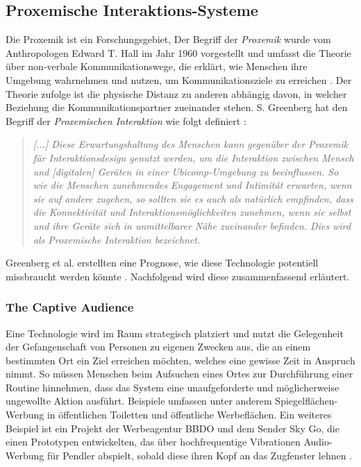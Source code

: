 \documentclass[a4paper]{article}
\newcommand{\todo}[1]{{\color{purple}{#1}}}
\begin{document}
\subsection{Proxemische Interaktions-Systeme}
\label{sub:proxemische_interaktions-systeme}{}
Die Proxemik ist ein Forschungsgebiet, 
Der Begriff der \textit{Proxemik} wurde vom Anthropologen Edward T. Hall im Jahr 1960 vorgestellt und umfasst die Theorie über non-verbale Kommunikationswege, die erklärt, wie Menschen ihre Umgebung wahrnehmen und nutzen, um Kommunikationsziele zu erreichen \cite{communicationstudies}. Der Theorie zufolge ist die physische Distanz zu anderen abhängig davon, in welcher Beziehung die Kommunikationspartner zueinander stehen. S. Greenberg hat den Begriff der \textit{Proxemischen Interaktion} wie folgt definiert \cite{marquardt}:\newline 
\begin{quote}
\textit{[...] Diese Erwartungshaltung des Menschen kann gegenüber der Proxemik für Interaktionsdesign genutzt werden, um die Interaktion zwischen Mensch und [digitalen] Geräten in einer Ubicomp-Umgebung \todo{Schönere Bezeichnung finden oder Definition formulieren} zu beeinflussen. So wie die Menschen zunehmendes Engagement und Intimität erwarten, wenn sie auf andere zugehen, so sollten sie es auch als natürlich empfinden, dass die Konnektivität und Interaktionsmöglichkeiten zunehmen, wenn sie selbst und ihre Geräte sich in unmittelbarer Nähe zueinander befinden. Dies wird als Proxemische Interaktion bezeichnet.}
\end{quote}
Greenberg et al. erstellten eine Prognose, wie diese Technologie potentiell missbraucht werden könnte \cite{greenberg}. Nachfolgend wird diese zusammenfassend erläutert.

\subsubsection{The Captive Audience}
Eine Technologie wird im Raum strategisch platziert und nutzt die Gelegenheit der \glqq Gefangenschaft\grqq{} von Personen zu eigenen Zwecken aus, die an einem bestimmten Ort ein Ziel erreichen möchten, welches eine gewisse Zeit in Anspruch nimmt. So müssen Menschen beim Aufsuchen eines Ortes zur Durchführung einer Routine hinnehmen, dass das System eine unaufgeforderte und möglicherweise ungewollte Aktion ausführt.\newline
Beispiele umfassen unter anderem Spiegelflächen-Werbung in öffentlichen Toiletten \cite{youtube} und öffentliche Werbeflächen. Ein weiteres Beispiel ist ein Projekt der Werbeagentur BBDO und dem Sender Sky Go, die einen Prototypen entwickelten, das über hochfrequentige Vibrationen Audio-Werbung für Pendler abspielt, sobald diese ihren Kopf an das Zugfenster lehnen \cite{zugfenster_ad}.  
\end{document}
